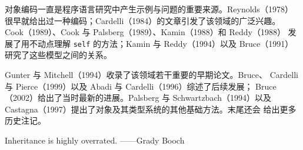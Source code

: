 对象编码一直是程序语言研究中产生示例与问题的重要来源。Reynolds（1978）
很早就给出过一种编码；Cardelli（1984）的文章引发了该领域的广泛兴趣。
Cook（1989）、Cook 与 Palsberg（1989）、Kamin（1988）和 Reddy（1988）
发展了用不动点理解 \texttt{self} 的方法；Kamin 与 Reddy（1994）以及
Bruce（1991）研究了这些模型之间的关系。

Gunter 与 Mitchell（1994）收录了该领域若干重要的早期论文。Bruce、
Cardelli 与 Pierce（1999）以及 Abadi 与 Cardelli（1996）综述了后续发展；
Bruce（2002）给出了当时最新的进展。Palsberg 与 Schwartzbach（1994）以及
Castagna（1997）提出了对象及其类型系统的其他基础方法。末尾还会
给出更多历史注记。

  {Inheritance is highly overrated.}
  {——Grady Booch}

